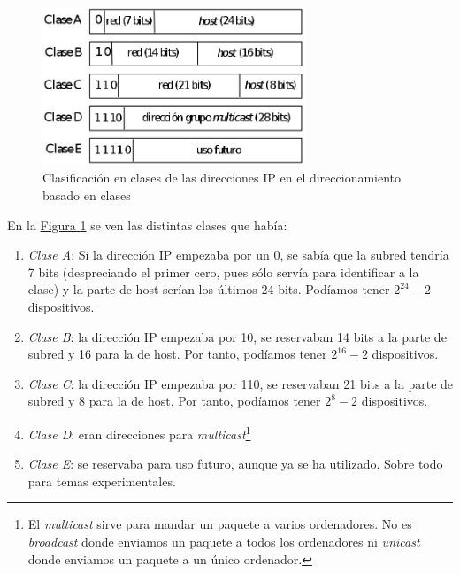 \documentclass[10pt,a4paper,spanish]{report}
\begin{document}
\begin{figure}[!h]
  \centering
  \includegraphics[width=0.7\textwidth]{classfull}
  \caption{Clasificación en clases de las direcciones IP en el direccionamiento basado en clases}
  \label{classfull}
\end{figure}

En la \hyperref[classfull]{Figura \ref*{classfull}} se ven las distintas clases que había:

\begin{enumerate}[\color{tema4}{$\bigstar$}]
  \item \textit{\textcolor{tema4}{Clase A}}: Si la dirección IP empezaba por un 0, se sabía que la subred tendría 7 bits (despreciando el primer cero, pues sólo servía para identificar a la clase) y la parte de host serían los últimos 24 bits. Podíamos tener $2^{24} - 2$ dispositivos.

  \item \textit{\textcolor{tema4}{Clase B}}: la dirección IP empezaba por 10, se reservaban 14 bits a la parte de subred y 16 para la de host. Por tanto, podíamos tener $2^{16} - 2$ dispositivos.

  \item \textit{\textcolor{tema4}{Clase C}}: la dirección IP empezaba por 110, se reservaban 21 bits a la parte de subred y 8 para la de host. Por tanto, podíamos tener $2^{8} - 2$ dispositivos.

  \item \textit{\textcolor{tema4}{Clase D}}: eran direcciones para \textcolor{tema4}{\textit{multicast}}\footnote{El \textit{\textcolor{tema4}{multicast}} sirve para mandar un paquete a varios ordenadores. No es \textit{\textcolor{tema4}{broadcast}} donde enviamos un paquete a todos los ordenadores ni \textit{\textcolor{tema4}{unicast}} donde enviamos un paquete a un único ordenador.}

  \item \textit{\textcolor{tema4}{Clase E}}: se reservaba para uso futuro, aunque ya se ha utilizado. Sobre todo para temas experimentales.
\end{enumerate}
\end{document}
